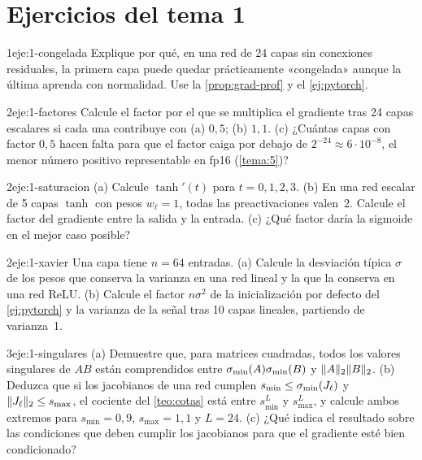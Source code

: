\section*{Ejercicios del tema 1}

\begin{ejercicio}{1}{eje:1-congelada}
Explique por qué, en una red de 24 capas sin conexiones residuales, la primera capa puede quedar prácticamente «congelada» aunque la última aprenda con normalidad. Use la \cref{prop:grad-prof} y el \cref{ej:pytorch}.
\end{ejercicio}

\begin{ejercicio}{2}{eje:1-factores}
Calcule el factor por el que se multiplica el gradiente tras 24 capas escalares si cada una contribuye con (a) $0{,}5$; (b) $1{,}1$. (c) ¿Cuántas capas con factor $0{,}5$ hacen falta para que el factor caiga por debajo de $2^{-24}\approx 6\cdot 10^{-8}$, el menor número positivo representable en fp16 (\cref{tema:5})?
\end{ejercicio}

\begin{ejercicio}{2}{eje:1-saturacion}
(a) Calcule $\tanh'(t)$ para $t=0,1,2,3$. (b) En una red escalar de 5 capas $\tanh$ con pesos $w_\ell=1$, todas las preactivaciones valen~2. Calcule el factor del gradiente entre la salida y la entrada. (c) ¿Qué factor daría la sigmoide en el mejor caso posible?
\end{ejercicio}

\begin{ejercicio}{2}{eje:1-xavier}
Una capa tiene $n=64$ entradas. (a) Calcule la desviación típica $\sigma$ de los pesos que conserva la varianza en una red lineal y la que la conserva en una red ReLU. (b) Calcule el factor $n\sigma^{2}$ de la inicialización por defecto del \cref{ej:pytorch} y la varianza de la señal tras 10 capas lineales, partiendo de varianza~1.
\end{ejercicio}

\begin{ejercicio}{3}{eje:1-singulares}
(a) Demuestre que, para matrices cuadradas, todos los valores singulares de $AB$ están comprendidos entre $\sigma_{\min}(A)\sigma_{\min}(B)$ y $\lVert A\rVert_2\lVert B\rVert_2$. (b) Deduzca que si los jacobianos de una red cumplen $s_{\min}\le\sigma_{\min}(J_\ell)$ y $\lVert J_\ell\rVert_2\le s_{\max}$, el cociente del \cref{teo:cotas} está entre $s_{\min}^{L}$ y $s_{\max}^{L}$, y calcule ambos extremos para $s_{\min}=0{,}9$, $s_{\max}=1{,}1$ y $L=24$. (c) ¿Qué indica el resultado sobre las condiciones que deben cumplir los jacobianos para que el gradiente esté bien condicionado?
\end{ejercicio}

